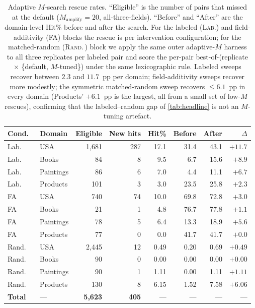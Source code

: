 \begin{table}[h]
\centering\small
\begin{tabular}{llrrrrrr}
\toprule
Cond.\ & Domain & Eligible & New hits & Hit\% & Before & After & $\Delta$ \\
\midrule
Lab.\ & USA       & 1{,}681 & 287 & 17.1 & 31.4 & 43.1 & $+11.7$ \\
Lab.\ & Books     &    84   &   8 &  9.5 &  6.7 & 15.6 &  $+8.9$ \\
Lab.\ & Paintings &    86   &   6 &  7.0 &  4.4 & 11.1 &  $+6.7$ \\
Lab.\ & Products  &   101   &   3 &  3.0 & 23.5 & 25.8 &  $+2.3$ \\
\midrule
FA    & USA       &   740   &  74 & 10.0 & 69.8 & 72.8 &  $+3.0$ \\
FA    & Books     &    21   &   1 &  4.8 & 76.7 & 77.8 &  $+1.1$ \\
FA    & Paintings &    78   &   5 &  6.4 & 13.3 & 18.9 &  $+5.6$ \\
FA    & Products  &    77   &   0 &  0.0 & 41.7 & 41.7 &  $+0.0$ \\
\midrule
Rand.\ & USA       & 2{,}445 & 12 & 0.49 & 0.20 & 0.69 & $+0.49$ \\
Rand.\ & Books     &    90   &  0 & 0.00 & 0.00 & 0.00 & $+0.00$ \\
Rand.\ & Paintings &    90   &  1 & 1.11 & 0.00 & 1.11 & $+1.11$ \\
Rand.\ & Products  &   130   &  8 & 6.15 & 1.52 & 7.58 & $+6.06$ \\
\midrule
\textbf{Total} & --- & \textbf{5{,}623} & \textbf{405} & --- & --- & --- & --- \\
\bottomrule
\end{tabular}
\caption{Adaptive $M$-search rescue rates. ``Eligible'' is the number of pairs that missed at the default ($M_{\mathrm{amplify}}{=}20$, all-three-fields). ``Before'' and ``After'' are the domain-level Hit\% before and after the search. For the labeled (\textsc{Lab.}) and field-additivity (\textsc{FA}) blocks the rescue is per intervention configuration; for the matched-random (\textsc{Rand.\,}) block we apply the same outer adaptive-$M$ harness to all three replicates per labeled pair and score the per-pair best-of-(replicate $\times$ \{default, $M$-tuned\}) under the same lexicographic rule. Labeled sweeps recover between $2.3$ and $11.7$~pp per domain; field-additivity sweeps recover more modestly; the symmetric matched-random sweep recovers $\leq 6.1$~pp in every domain (Products' $+6.1$~pp is the largest, all from a small set of low-$M$ rescues), confirming that the labeled--random gap of \cref{tab:headline} is not an $M$-tuning artefact.}
\label{tab:msearch-rescue}
\end{table}

